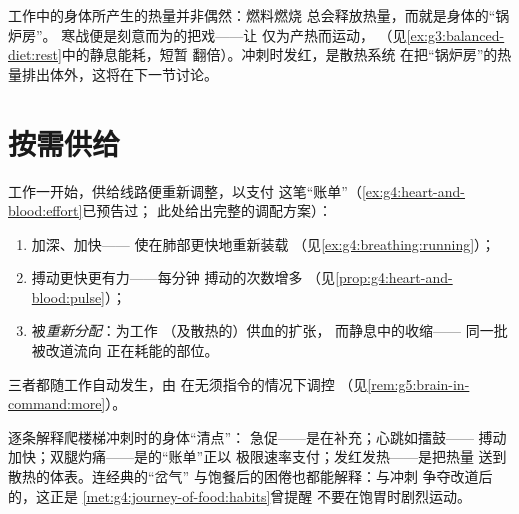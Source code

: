 \begin{remark}[热量即凭证]\label{rem:g7:organs-at-work:warmth}
工作中的身体所产生的热量并非偶然：燃料燃烧
总会释放热量，而就是身体的“锅炉房”。
寒战便是刻意而为的把戏——让
仅为产热而运动，
（见\cref{ex:g3:balanced-diet:rest}中的静息能耗，短暂
翻倍）。冲刺时发红，是散热系统
在把“锅炉房”的热量排出体外，这将在下一节讨论。
\end{remark}

\section{按需供给}

\begin{proposition}[身体重新调配供给]\label{prop:g7:organs-at-work:supply}
工作一开始，供给线路便重新调整，以支付
这笔“账单”（\cref{ex:g4:heart-and-blood:effort}已预告过；
此处给出完整的调配方案）：
\begin{enumerate}
  \item \emph{}加深、加快——
        使在肺部更快地重新装载
        （见\cref{ex:g4:breathing:running}）；
  \item \emph{}搏动更快更有力——每分钟
        搏动的次数增多
        （见\cref{prop:g4:heart-and-blood:pulse}）；
  \item {}被\emph{重新分配}：为工作
        （及散热的）供血的扩张，
        而静息中的收缩——
        同一批被改道流向
        正在耗能的部位。
\end{enumerate}
三者都随工作自动发生，由
在无须指令的情况下调控
（见\cref{rem:g5:brain-in-command:more}）。
\end{proposition}
\admitted

\begin{example}[从内部感受到的调配]\label{ex:g7:organs-at-work:felt}
逐条解释爬楼梯冲刺时的身体“清点”：
急促——是在补充；心跳如擂鼓——
搏动加快；双腿灼痛——是的“账单”正以
极限速率支付；发红发热——是把热量
送到散热的体表。连经典的“岔气”
与饱餐后的困倦也都能解释：与冲刺
争夺改道后的，这正是
\cref{met:g4:journey-of-food:habits}曾提醒
不要在饱胃时剧烈运动。
\end{example}

